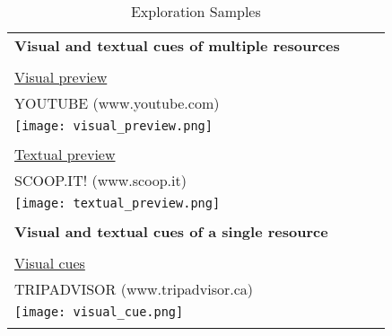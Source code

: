 \begin{longtable}{|p{0.90\linewidth}|}
\caption{Exploration Samples}\\

\hline
\textbf{Visual and textual cues of multiple resources}  \\
\\
\underline{Visual preview}                 \\
YOUTUBE (www.youtube.com)\\
\texttt{[image: visual\_preview.png]}\\
\\
\underline{Textual preview} \\
SCOOP.IT! (www.scoop.it)\\
\texttt{[image: textual\_preview.png]}\\
\\
\hline
\pagebreak
\hline
\textbf{Visual and textual cues of a single resource} \\
\\
\underline{Visual cues}                  \\
TRIPADVISOR (www.tripadvisor.ca)\\
\texttt{[image: visual\_cue.png]}\\
\\


\end{longtable}
